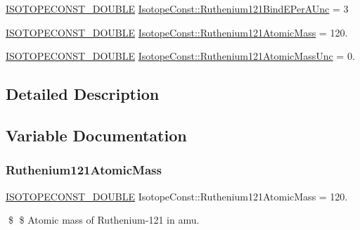 \begin{DoxyCompactItemize}
\mbox{\hyperlink{group___isotope_const-_macros_ga8f45a7272ce02c0b4c65c44636ed719a}{I\+S\+O\+T\+O\+P\+E\+C\+O\+N\+S\+T\+\_\+\+D\+O\+U\+B\+LE}} \mbox{\hyperlink{group___isotope_const-_ruthenium-_ru121_ga06568cc711705d738f8de937ef41779f}{Isotope\+Const\+::\+Ruthenium121\+Bind\+E\+Per\+A\+Unc}} = 3
\item 
\mbox{\hyperlink{group___isotope_const-_macros_ga8f45a7272ce02c0b4c65c44636ed719a}{I\+S\+O\+T\+O\+P\+E\+C\+O\+N\+S\+T\+\_\+\+D\+O\+U\+B\+LE}} \mbox{\hyperlink{group___isotope_const-_ruthenium-_ru121_ga82f62ece418771141befd94b203bec22}{Isotope\+Const\+::\+Ruthenium121\+Atomic\+Mass}} = 120.
\item 
\mbox{\hyperlink{group___isotope_const-_macros_ga8f45a7272ce02c0b4c65c44636ed719a}{I\+S\+O\+T\+O\+P\+E\+C\+O\+N\+S\+T\+\_\+\+D\+O\+U\+B\+LE}} \mbox{\hyperlink{group___isotope_const-_ruthenium-_ru121_ga45dba16c5e1885af6b1364f1fb565c37}{Isotope\+Const\+::\+Ruthenium121\+Atomic\+Mass\+Unc}} = 0.
\end{DoxyCompactItemize}


\subsection{Detailed Description}


\subsection{Variable Documentation}
\mbox{\label{group___isotope_const-_ruthenium-_ru121_ga82f62ece418771141befd94b203bec22}} 
\subsubsection{\texorpdfstring{Ruthenium121\+Atomic\+Mass}{Ruthenium121AtomicMass}}
{\footnotesize\ttfamily \mbox{\hyperlink{group___isotope_const-_macros_ga8f45a7272ce02c0b4c65c44636ed719a}{I\+S\+O\+T\+O\+P\+E\+C\+O\+N\+S\+T\+\_\+\+D\+O\+U\+B\+LE}} Isotope\+Const\+::\+Ruthenium121\+Atomic\+Mass = 120.}

\$ \$ Atomic mass of Ruthenium-\/121 in amu. \mbox{\label{group___isotope_const-_ruthenium-_ru121_ga45dba16c5e1885af6b1364f1fb565c37}} 
